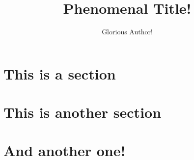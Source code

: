 \documentclass{fhnwfactsheet}
\title{Phenomenal Title!}
\author{Glorious Author!}
\begin{document}
\begin{factpage}

\begin{overview}
    \lipsum[2]
\end{overview}

\begin{content}

    \section{This is a section}
    \lipsum[2]
    \section{This is another section}
    \lipsum[4]
    \section{And another one!}
    \lipsum[5]

\end{content}

\lipsum[1]


\begin{students}
    \lipsum[2]
\end{students}

\begin{coaches}
    \lipsum[2]
\end{coaches}

\begin{partners}
    \lipsum[2]
\end{partners}

\end{factpage}
\end{document}
